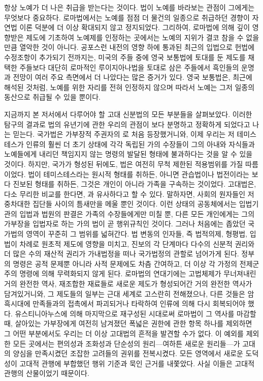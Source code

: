 항상 노예가 더 나은 취급을 받는다는 것이다.
법이 노예를 바라보는 관점이 그에게는 무엇보다 중요하다.
로마법에서는
노예를 점점 더 물건의 일종으로 취급하던 경향이
자연법 이론 덕분에
더 이상 확대되지 않고 정지되었다.
그리하여,
로마법에 의해 깊이 영향받은 제도에 기초하여 노예제를 인정하는 곳에서는
노예의 지위가 결코 참을 수 없을 만큼 열악한 것이 아니다.
공포스런 내전의 영향 하에 통과된 최근의 입법으로
헌법에 수정조항이 추가되기 전까지는,
미국의 주들 중에
영국 보통법에 토대를 둔 제도를 채택한 주들보다
대단히 로마적인 루이지아나법을 토대로 삼은 주들에서
흑인들의 운명과 전망이 여러 주요 측면에서 더 나았다는
많은 증거가 있다.
영국 보통법은, 최근에 해석된 것처럼,
노예를 위한 자리를 전혀 인정하지 않으며
따라서 노예는 그저 일종의 동산으로 취급될 수 있을 뿐이다.

지금까지 본 저서에서 다루어야 할 고대 신분법의 모든 부분들을 살펴보았다.
이러한 탐구의 결과로
법의 유년기에 관한 우리의 관점이 보다 분명하고 정확하게 되었다고
나는 믿는다.
국가법은
가부장적 주권자의 로
처음 등장했거니와,
이제 우리는
저 테미스테스가
인류의 훨씬 더 초기 상태에
각각 독립된 가의 수장들이 그의 아내와 자식들과 노예들에게 내리던
책임지지 않는 명령의
발달된 형태에 불과하다는 것을
알 수 있을 것이다.
하지만, 국가가 형성된 뒤에도,
법은 여전히 무척 제한된 적용범위를 가질 따름이었다.
법이 테미스테스라는 원시적 형태를 취하든,
아니면 관습법이나 법전이라는 보다 진보된 형태를 취하든,
그것은 개인이 아니라 가족을 구속하는 것이었다.
고대법은,
다소 무리한 비교를 한다면, 과 유사하다고 할 수 있다.
말하자면, 사회의 원자들인 저 중차대한 집단들 사이의 틈새만을 메울 뿐인 것이다.
이런 상태의 공동체에서는
입법기관의 입법과 법원의 판결은
가족의 수장들에게만 미칠 뿐,
다른 모든 개인에게는
그의 가부장을 입법자로 하는
가의 법이 곧 행위규칙인 것이다.
그러나 처음에는 좁았던 국가법의 영역이 꾸준히 그 범위를 넓혀간다.
법 변동의 인자들, 즉
법적의제, 형평법, 입법이 차례로 원초적 제도에 영향을 미치고,
진보의 각 단계마다
다수의 신분적 권리와 더 많은 수의 재산적 권리가
가내법정을 떠나 국가법정의 관할로 넘어가게 된다.
정부의 명령은 공적 문제뿐 아니라 사적 문제에도 차츰 간여하고,
더 이상 각 가정의 전제군주의 명령에 의해 무력화되지 않게 된다.
로마법의 연대기에는
고법체제가 무너져내린 거의 완전한 역사,
재조합한 재료들로 새로운 제도가 형성되어간
거의 완전한 역사가 담겨있거니와,
그 제도들의 일부는 근대 세계로 고스란히 전해졌으나,
다른 것들은 암흑시대에 만족들과의 접촉에서 파괴되거나 타락하여
인류에 의해 다시 회복되어야 했다.
유스티니아누스에 의해 마지막으로 재구성된 시대로써
로마법이 그 역사를 마감할 때,
살아있는 가부장에게 여전히 남겨졌던 폭넓은 권한에 관한 항목 하나를 제외하면
그 어떤 부분에서도 우리는 더 이상 고대법의 흔적을 발견할 수가 없다.
이 예외를 제외한 모든 곳에서는
편의성과 조화성과 단순성의 원리---여하튼 새로운 원리들---가
고대의 양심을 만족시켰던 조잡한 고려들의 권위를 전복시켰다.
모든 영역에서
새로운 도덕성이 고대적 관행에 부합했던 행위 기준과 묵인 근거를
내쫓았다. 사실 이들은 고대적 관행의 산물이었기 때문이다.

